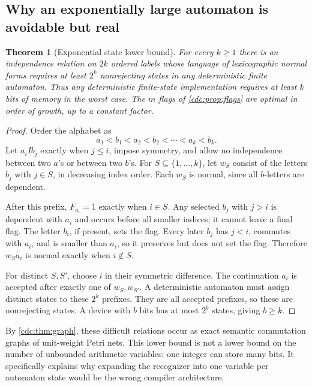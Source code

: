 \documentclass[11pt,a4paper]{article}
\newtheorem{theorem}{Theorem}[section]
\theoremstyle{definition}
\theoremstyle{remark}
\begin{document}
\subsection{Why an exponentially large automaton is avoidable but real}
\begin{theorem}[Exponential state lower bound]\label{cdc:thm:memory}
For every $k\ge1$ there is an independence relation on $2k$ ordered labels whose language of lexicographic normal forms requires at least $2^k$ nonrejecting states in any deterministic finite automaton. Thus any deterministic finite-state implementation requires at least $k$ bits of memory in the worst case. The $m$ flags of \cref{cdc:prop:flags} are optimal in order of growth, up to a constant factor.
\end{theorem}
\begin{proof}
Order the alphabet as
\[
a_1<b_1<a_2<b_2<\cdots<a_k<b_k.
\]
Let $a_iIb_j$ exactly when $j\le i$, impose symmetry, and allow no independence between two $a$'s or between two $b$'s. For $S\subseteq\{1,\ldots,k\}$, let $w_S$ consist of the letters $b_j$ with $j\in S$, in decreasing index order. Each $w_S$ is normal, since all $b$-letters are dependent.

After this prefix, $F_{a_i}=1$ exactly when $i\in S$. Any selected $b_j$ with $j>i$ is dependent with $a_i$ and occurs before all smaller indices; it cannot leave a final flag. The letter $b_i$, if present, sets the flag. Every later $b_j$ has $j<i$, commutes with $a_i$, and is smaller than $a_i$, so it preserves but does not set the flag. Therefore $w_Sa_i$ is normal exactly when $i\notin S$.

For distinct $S,S'$, choose $i$ in their symmetric difference. The continuation $a_i$ is accepted after exactly one of $w_S,w_{S'}$. A deterministic automaton must assign distinct states to these $2^k$ prefixes. They are all accepted prefixes, so these are nonrejecting states. A device with $b$ bits has at most $2^b$ states, giving $b\ge k$.
\end{proof}

By \cref{cdc:thm:graph}, these difficult relations occur as exact semantic commutation graphs of unit-weight Petri nets. This lower bound is not a lower bound on the number of unbounded arithmetic variables: one integer can store many bits. It specifically explains why expanding the recognizer into one variable per automaton state would be the wrong compiler architecture.
\end{document}
